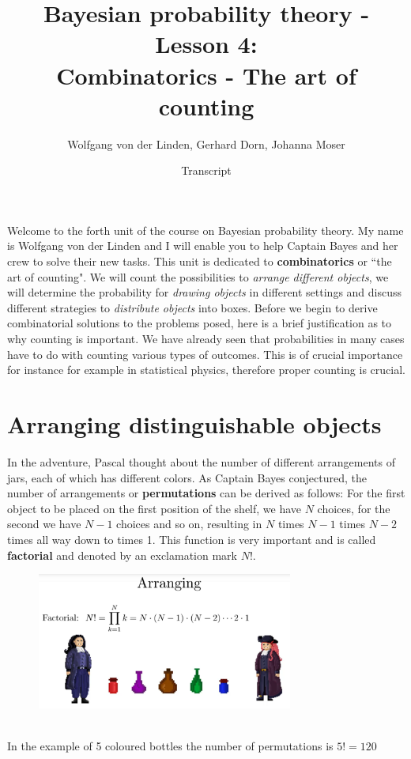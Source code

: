 \documentclass[12pt, a4paper]{scrartcl}
\title{Bayesian probability theory - Lesson 4:\\
Combinatorics - The art of counting}
\author{Wolfgang von der Linden, Gerhard Dorn, Johanna Moser}
\date{Transcript}
\begin{document}
\setlength{\parindent}{0pt}
\maketitle
\onehalfspacing

Welcome to the forth unit of the course on Bayesian probability theory. 
My name is Wolfgang von der Linden and I will enable you to help Captain Bayes and her crew to solve their new tasks.
This unit is dedicated to \textbf{combinatorics} or ``the art of counting".
We will count the possibilities to \textit{arrange different objects}, we will determine the probability for \textit{drawing objects} in different settings and discuss different strategies to \textit{distribute objects} into boxes.
Before we begin to derive combinatorial solutions to the problems posed, here is a brief justification as to why counting is important.
We have already seen that probabilities in many cases have to do with counting various types of outcomes. This is of crucial importance for instance for example in statistical physics, therefore proper counting is crucial.\\

\section*{Arranging distinguishable objects}
In the adventure, Pascal thought about the number of different arrangements of jars, each of which has different colors. 
As Captain Bayes conjectured, the number of arrangements or \textbf{permutations} can be derived as follows:
For the first object to be placed on the first position of the shelf, we have $N$ choices,  for the second we have $N-1$ choices and so on, resulting in $N$ times $N-1$ times  $N-2$ times all way down to times 1.
This function is very important and is called \textbf{factorial} and denoted by an exclamation mark $N!$.
 \begin{figure}[H]
	\centering
	\includegraphics[width=0.75\textwidth]{4_1.png}
\end{figure}
\\[0.2cm]
In the example of 5 coloured bottles the number of permutations is $5!=120$\\[0.2cm]
\\
\end{document}
